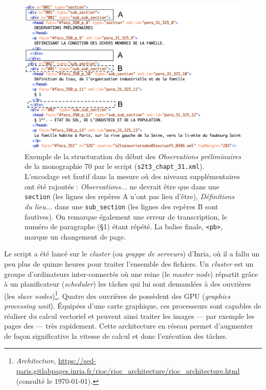 \begin{figure}[t]
    \centering
    \includegraphics[width=16cm]{img/ex_structure.png}
    \caption[Exemple de la structuration du début de la monographie \no{} 70]{Exemple de la structuration du début des \textit{Observations préliminaires} de la monographie \no{} 70 par le script \lse{} (\texttt{s2t3\_chapt\_31.xml}). L'encodage est fautif dans la mesure où des niveaux supplémentaires ont été rajoutés : \textit{Observations...} ne devrait être que dans une \texttt{section} (les lignes des repères A n'ont pas lieu d'être), \textit{Définitions du lieu...} dans une \texttt{sub\_section} (les lignes des repères B sont fautives). On remarque également une erreur de transcription, le numéro de paragraphe (§1) étant répété. La balise finale, \texttt{<pb>}, marque un changement de page.}
    \label{fig:ex_structure}
\end{figure}

Le script \lse{} a été lancé sur le \textit{cluster} (ou \textit{grappe de serveurs}) \rioc{} d'Inria, où il a fallu un peu plus de quinze heures pour traiter l'ensemble des fichiers. Un \textit{cluster} est un groupe d'ordinateurs inter-connectés où une \og reine \fg{} (le \textit{master node}) répartit grâce à un \og planificateur \fg{} (\textit{scheduler}) les tâches qui lui sont demandées à des \og ouvrières \fg{} (les \textit{slave nodes})\footnote{\textit{\rioc{} Architecture}, \url{https://sed-paris.gitlabpages.inria.fr/rioc/rioc_architecture/rioc_architecture.html} (consulté le \today).}. Quatre des \og ouvrières \fg{} de \rioc{} possèdent des GPU (\textit{graphics processing unit}). Équipées d'une carte graphique, ces processeurs sont capables de réaliser du calcul vectoriel et peuvent ainsi traiter les images --- par exemple les pages des \odm{} --- très rapidement. Cette architecture en réseau permet d'augmenter de façon significative la vitesse de calcul et donc l'exécution des tâches.

